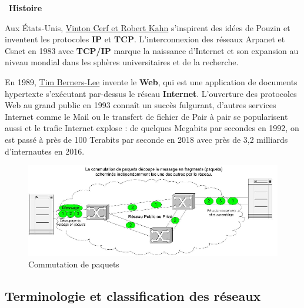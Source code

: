 \documentclass[
  11pt,
]{article}
\newcounter{rque}
\newcounter{logi}
\newcounter{histo}
\newenvironment{histoire}[1]
{\par \medskip   \addtocounter{histo}{1} \noindent  
 \begin {bclogo}[couleur = blue!10 , arrondi =0.1,logo=\bchorloge, marge=4] {~\textbf{Histoire} \textbf{\thehisto} {\itshape #1} }  \par}
{
\end{bclogo}
 \par \bigskip }
\begin{document}
\begin{histoire}{}
Aux États-Unis, \href{https://fr.wikipedia.org/wiki/Vint_Cerf}{Vinton
Cerf et Robert Kahn} s'inspirent des idées de Pouzin et inventent les
protocoles \textbf{IP} et \textbf{TCP}. L'interconnexion des réseaux
Arpanet et Csnet en 1983 avec \textbf{TCP/IP} marque la naissance
d'Internet et son expansion au niveau mondial dans les sphères
universitaires et de la recherche.

En 1989,
\href{https://interstices.info/les-debuts-du-web-sous-loeil-du-w3c/}{Tim
Berners-Lee} invente le \textbf{Web}, qui est une application de
documents hypertexte s'exécutant par-dessus le réseau \textbf{Internet}.
L'ouverture des protocoles Web au grand public en 1993 connaît un succès
fulgurant, d'autres services Internet comme le Mail ou le transfert de
fichier de Pair à pair se popularisent aussi et le trafic Internet
explose : de quelques Megabits par secondes en 1992, on est passé à près
de 100 Terabits par seconde en 2018 avec près de 3,2 milliards
d'internautes en 2016.

\end{histoire}

\begin{figure}
\centering
\includegraphics{images/commutationpaquets.png}
\caption{Commutation de paquets}
\end{figure}

\hypertarget{terminologie-et-classification-des-ruxe9seaux}{%
\subsection{Terminologie et classification des
réseaux}\label{terminologie-et-classification-des-ruxe9seaux}}
\end{document}
